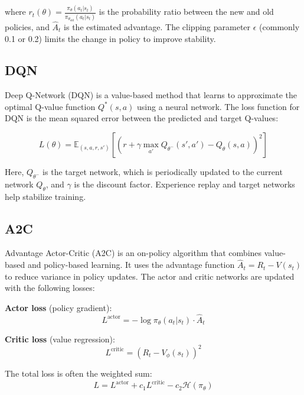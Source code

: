 \documentclass[10pt,twocolumn,letterpaper]{article}
\begin{document}
where \( r_t(\theta) = \frac{\pi_\theta(a_t|s_t)}{\pi_{\theta_{\text{old}}}(a_t|s_t)} \) is the probability ratio between the new and old policies, and \( \hat{A}_t \) is the estimated advantage. The clipping parameter \( \epsilon \) (commonly 0.1 or 0.2) limits the change in policy to improve stability.~\cite{ppo}

\subsection{DQN}

Deep Q-Network (DQN) is a value-based method that learns to approximate the optimal Q-value function \( Q^*(s, a) \) using a neural network. The loss function for DQN is the mean squared error between the predicted and target Q-values:

\begin{equation*}
L(\theta) = \mathbb{E}_{(s,a,r,s')} \left[ \left( r + \gamma \max_{a'} Q_{\theta^{-}}(s', a') - Q_\theta(s, a) \right)^2 \right]
\end{equation*}

Here, \( Q_{\theta^{-}} \) is the target network, which is periodically updated to the current network \( Q_\theta \), and \( \gamma \) is the discount factor. Experience replay and target networks help stabilize training.~\cite{dqn}

\subsection{A2C}

Advantage Actor-Critic (A2C) is an on-policy algorithm that combines value-based and policy-based learning. It uses the advantage function \( \hat{A}_t = R_t - V(s_t) \) to reduce variance in policy updates. The actor and critic networks are updated with the following losses:

\textbf{Actor loss} (policy gradient):
\begin{equation*}
L^{\text{actor}} = -\log \pi_\theta(a_t|s_t) \cdot \hat{A}_t
\end{equation*}

\textbf{Critic loss} (value regression):
\begin{equation*}
L^{\text{critic}} = \left( R_t - V_\phi(s_t) \right)^2
\end{equation*}

The total loss is often the weighted sum:
\begin{equation*}
L = L^{\text{actor}} + c_1 L^{\text{critic}} - c_2 \mathcal{H}(\pi_\theta)
\end{equation*}
\end{document}
